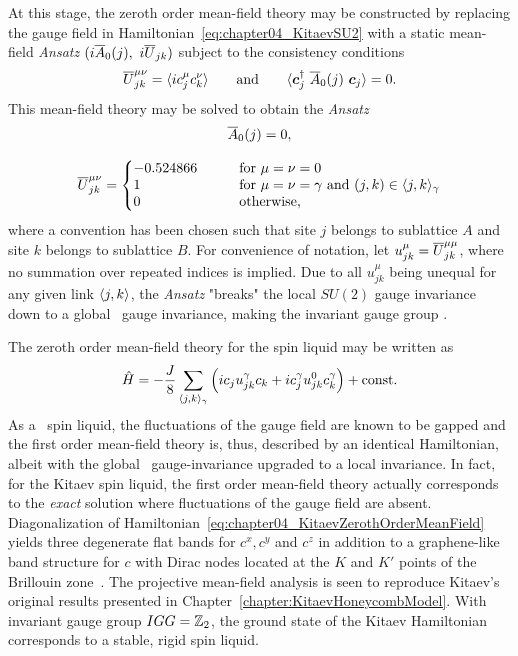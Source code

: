 At this stage, the zeroth order mean-field theory may be constructed by replacing the gauge field in Hamiltonian~\eqref{eq:chapter04_KitaevSU2} with a static mean-field \textit{Ansatz} $(i\overline{A}_0(j),~i\overline{U}_{jk})$ subject to the consistency conditions
%
\begin{equation}
	\overline{U}^{\mu\nu}_{jk} = \langle i c^{\mu}_j c^{\nu}_k \rangle \qquad {\rm and } \qquad \langle \bm{c}^{\dagger}_j ~ \overline{A}_0(j) ~ \bm{c}_j \rangle = 0.
\end{equation}
%
This mean-field theory may be solved to obtain the \textit{Ansatz}~\cite{YouPRB2012,SeifertPRBFeb2018}
%
\begin{equation}
	\begin{matrix*}[c]
		\ansatz{A}_0(j) 			= 0, \\
		\\
		\ansatz{U}^{\mu\nu}_{jk}	= \left\{
			\begin{matrix*}[l]
				-0.524866 &
				\qquad \text{for $\mu = \nu = 0$}\\
				1 &
				\qquad \text{for $\mu = \nu = \gamma$ and $(j,k) \in \avg{j,k}_{\gamma}$}\\
				0 &
				\qquad \text{otherwise,}
			\end{matrix*}
			\right.
	\end{matrix*}
\end{equation}
%
where a convention has been chosen such that site $j$ belongs to sublattice $A$ and site $k$ belongs to sublattice $B$.
For convenience of notation, let $u^{\mu}_{jk} = \overline{U}^{\mu\mu}_{jk}$, where no summation over repeated indices is implied.
Due to all $u^{\mu}_{jk}$ being unequal for any given link $\langle j,k \rangle$, the \textit{Ansatz} "breaks" the local $SU(2)$ gauge invariance down to a global \ZZ~gauge invariance, making the invariant gauge group \ZZ.

The zeroth order mean-field theory for the spin liquid may be written as
%
\begin{equation}
	\hat{H} = -\frac{J}{8} \sum_{\langle j,k \rangle_{\gamma}} \left( i c_j u^{\gamma}_{jk} c_k + i c^{\gamma}_j u^0_{jk} c^{\gamma}_k \right) + {\rm const}.
	\label{eq:chapter04_KitaevZerothOrderMeanField}
\end{equation}
%
As a \ZZ~spin liquid, the fluctuations of the gauge field are known to be gapped and the first order mean-field theory is, thus, described by an identical Hamiltonian, albeit with the global \ZZ~gauge-invariance upgraded to a local invariance.
In fact, for the Kitaev spin liquid, the first order mean-field theory actually corresponds to the \textit{exact} solution where fluctuations of the gauge field are absent.
Diagonalization of Hamiltonian~\eqref{eq:chapter04_KitaevZerothOrderMeanField} yields three degenerate flat bands for $c^x, c^y$ and $c^z$ in addition to a graphene-like band structure for $c$ with Dirac nodes located at the $K$ and $K'$ points of the Brillouin zone~\cite{YouPRB2012,SeifertPRBFeb2018}.
The projective mean-field analysis is seen to reproduce Kitaev's original results presented in Chapter~\ref{chapter:KitaevHoneycombModel}.
With invariant gauge group $IGG = \mathbb{Z}_{2}$, the ground state of the Kitaev Hamiltonian corresponds to a stable, rigid spin liquid.

